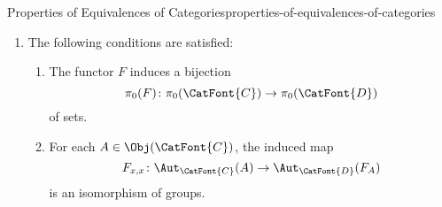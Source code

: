 \begin{proposition}{Properties of Equivalences of Categories}{properties-of-equivalences-of-categories}
\begin{enumerate}
\begin{enumerate}
                \item\label{properties-of-equivalences-of-categories-interaction-with-groupoids-b}The following conditions are satisfied:
                    \begin{enumerate}
                        \item\label{properties-of-equivalences-of-categories-interaction-with-groupoids-b-a}The functor $F$ induces a bijection
                            \[
                                \pi_{0}(F)%
                                \colon%
                                \pi_{0}(\CatFont{C})%
                                \to%
                                \pi_{0}(\CatFont{D})%
                            \]%
                            of sets.
                        \item\label{properties-of-equivalences-of-categories-interaction-with-groupoids-b-b}For each $A\in\Obj(\CatFont{C})$, the induced map
                            \[
                                F_{x,x}%
                                \colon%
                                \Aut_{\CatFont{C}}(A)%
                                \to%
                                \Aut_{\CatFont{D}}(F_{A})%
                            \]%
                            is an isomorphism of groups.
                    \end{enumerate}
            \end{enumerate}
    \end{enumerate}
\end{proposition}

